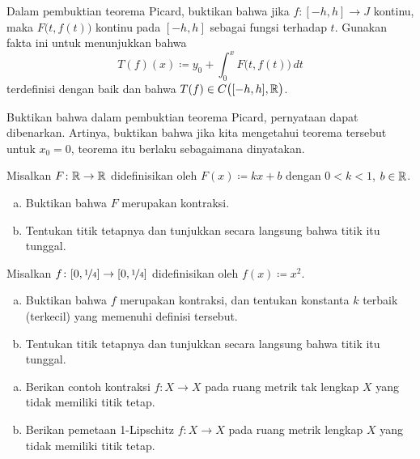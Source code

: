 \begin{exercise}
Dalam pembuktian teorema Picard,
buktikan bahwa jika $f \colon [-h,h] \to J$ kontinu, maka $F\bigl(t,f(t)\bigr)$
kontinu pada $[-h,h]$ sebagai fungsi terhadap $t$.  Gunakan fakta ini untuk menunjukkan bahwa
\begin{equation*}
T(f)(x)
\coloneqq
y_0 + \int_0^x F\bigl(t,f(t)\bigr)\,dt
\end{equation*}
terdefinisi dengan baik dan bahwa $T(f) \in C\bigl([-h,h],{\mathbb{R}}\bigr)$.
\end{exercise}


\begin{exercise}
Buktikan bahwa dalam pembuktian teorema Picard,
pernyataan 
dapat dibenarkan.  Artinya, buktikan bahwa jika kita mengetahui teorema tersebut untuk $x_0 = 0$,
teorema itu berlaku sebagaimana dinyatakan.
\end{exercise}

\begin{exercise}
\pagebreak[2]
Misalkan $F \colon {\mathbb{R}} \to {\mathbb{R}}$ didefinisikan oleh
$F(x) \coloneqq kx + b$ dengan $0 < k < 1$, $b \in {\mathbb{R}}$.
\begin{enumerate}[a)]
\item
Buktikan bahwa $F$ merupakan kontraksi.
\item
Tentukan titik tetapnya dan tunjukkan secara langsung bahwa titik itu tunggal.
\end{enumerate}
\end{exercise}

\begin{exercise}
\pagebreak[2]
Misalkan $f \colon [0,\nicefrac{1}{4}] \to [0,\nicefrac{1}{4}]$ didefinisikan oleh
$f(x) \coloneqq x^2$.
\begin{enumerate}[a)]
\item
Buktikan bahwa $f$
merupakan kontraksi, dan tentukan konstanta $k$ terbaik (terkecil) yang memenuhi definisi tersebut.
\item
Tentukan titik tetapnya dan tunjukkan secara langsung bahwa titik itu tunggal.
\end{enumerate}
\end{exercise}

\begin{samepage}
\begin{exercise} \label{exercise:nofixedpoint}
\leavevmode
\begin{enumerate}[a)]
\item
Berikan contoh kontraksi $f \colon X \to X$
pada ruang metrik tak lengkap $X$ yang tidak memiliki
titik tetap.
\item
Berikan pemetaan 1-Lipschitz $f \colon X \to X$ pada ruang metrik lengkap $X$ yang tidak memiliki titik tetap.
\end{enumerate}
\end{exercise}
\end{samepage}

